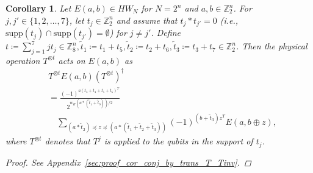 \documentclass[twoside,romanappendices]{IEEEtran}
\newtheorem{corollary}[theorem]{Corollary}
\begin{document}
\begin{corollary}
\label{cor:conj_by_trans_T_Tinv}
Let $E(a,b) \in HW_N$ for $N = 2^n$ and $a,b \in \mathbb{Z}_2^n$.
For $j,j' \in \{ 1,2,\ldots,7 \}$, let $t_j \in \mathbb{Z}_2^n$ and assume that $t_j \ast t_{j'} = 0$ (i.e., $\text{supp}(t_j) \cap \text{supp}(t_{j'}) = \emptyset$) for $j \neq j'$.
Define $t \coloneqq \sum_{j=1}^{7} j t_j \in \mathbb{Z}_8^n , \tilde{t}_1 \coloneqq t_1 + t_5, \tilde{t}_2 \coloneqq t_2 + t_6, \tilde{t}_3 \coloneqq t_3 + t_7 \in \mathbb{Z}_2^n$.
Then the physical operation $T^{\otimes t}$ acts on $E(a,b)$ as
\begin{align}
& T^{\otimes t} E(a,b) \left( T^{\otimes t} \right)^{\dagger} \nonumber \\
%
  & = \frac{ (-1)^{a (t_3 + t_4 + t_5 + t_6)^T} }{2^{w_H(a \ast (\tilde{t}_1 + \tilde{t}_3))/2}} \nonumber \\
%
  & \quad \sum_{(a \ast \tilde{t}_2) \preceq z \preceq (a \ast (\tilde{t}_1 + \tilde{t}_2 + \tilde{t}_3))}  (-1)^{(b + \tilde{t}_3) z^T} E\left( a, b \oplus z \right),
\end{align}
where $T^{\otimes t}$ denotes that $T^j$ is applied to the qubits in the support of $t_j$.
\begin{proof}
See Appendix~\ref{sec:proof_cor_conj_by_trans_T_Tinv}.
\end{proof}
\end{corollary}


\end{document}

